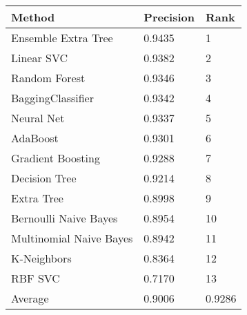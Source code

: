 \begin{tabular}{|l|l|l| }
\hline
Method                  & Precision & Rank \\ \hline
Ensemble Extra Tree     & 0.9435 & 1\\
Linear SVC              & 0.9382 & 2\\
Random Forest           & 0.9346 & 3\\
BaggingClassifier       & 0.9342 & 4\\
Neural Net              & 0.9337 & 5\\
AdaBoost                & 0.9301 & 6\\
Gradient Boosting       & 0.9288 & 7\\
Decision Tree           & 0.9214 & 8\\
Extra Tree              & 0.8998 & 9\\
Bernoulli Naive Bayes   & 0.8954 & 10\\
Multinomial Naive Bayes & 0.8942 & 11\\
K-Neighbors             & 0.8364 & 12\\
RBF SVC                 & 0.7170 & 13\\
Average & 0.9006 & 0.9286 & \\
\hline
\end{tabular}